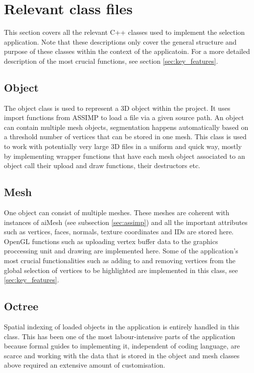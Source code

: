 \section{Relevant class files}
\label{sec:relevant_class_files}

This section covers all the relevant C++ classes used to implement the selection application. Note that these descriptions only cover the general structure and purpose of these classes within the context of the applicatoin. For a more detailed description of the most crucial functions, see section \ref{sec:key_features}.

\subsection{Object}
\label{sec:object}

The object class is used to represent a 3D object within the project. It uses import functions from ASSIMP to load a file via a given source path. An object can contain multiple mesh objects, segmentation happens automatically based on a threshold number of vertices that can be stored in one mesh. This class is used to work with potentially very large 3D files in a uniform and quick way, mostly by implementing wrapper functions that have each mesh object associated to an object call their upload and draw functions, their destructors etc.

\subsection{Mesh}
\label{sec:mesh}

One object can consist of multiple meshes. These meshes are coherent with instances of aiMesh (see subsection \ref{sec:assimp}) and all the important attributes such as vertices, faces, normals, texture coordinates and IDs are stored here. OpenGL functions such as uploading vertex buffer data to the graphics proccessing unit and drawing are implemented here. Some of the application's most crucial functionalities such as adding to and removing vertices from the global selection of vertices to be highlighted are implemented in this class, see \ref{sec:key_features}.

\subsection{Octree}
\label{sec:octree}
Spatial indexing of loaded objects in the application is entirely handled in this class. This has been one of the most labour-intensive parts of the application because formal guides to implementing it, independent of coding language, are scarce and working with the data that is stored in the object and mesh classes above required an extensive amount of customisation.

